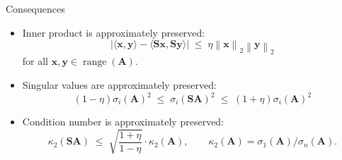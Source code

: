 \documentclass[xcolor=dvipsnames,10pt]{beamer}
\newcommand{\norm}[1]{\left\lVert#1\right\rVert}
\renewcommand{\vec}[1]{\bm{#1}}
\newcommand{\mat}[1]{\bm{#1}}
\begin{document}
\begin{frame}{Consequences}
\begin{itemize}
  \item Inner product is approximately preserved:
  \begin{equation*}
    |\langle\vec{x},\vec{y}\rangle - \langle\mat{S}\vec{x},\mat{S}\vec{y}\rangle|
    \;\leq\; \eta\norm{\vec{x}}_2\norm{\vec{y}}_2
  \end{equation*}
  for all $\vec{x},\vec{y}\in\operatorname{range}(\mat{A})$.
  \pause
  \item Singular values are approximately preserved:
  \begin{equation*}
    (1-\eta)\sigma_i(\mat{A})^2 \;\leq\;
    \sigma_i(\mat{SA})^2 \;\leq\; (1+\eta)\sigma_i(\mat{A})^2
  \end{equation*}
  \item Condition number is approximately preserved:
  \begin{equation*}
    \kappa_2(\mat{SA}) \;\leq\; \sqrt{\frac{1+\eta}{1-\eta}}\cdot\kappa_2(\mat{A}),
    \qquad \kappa_2(\mat{A})=\sigma_1(\mat{A})/\sigma_n(\mat{A}).
  \end{equation*}
\end{itemize}
\end{frame}

\end{document}
